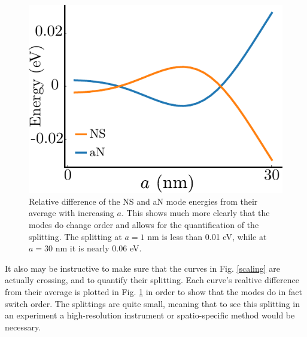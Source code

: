 \documentclass [11pt, proquest] {uwthesis}[2016/11/22]
\begin{document}
\newpage
\begin{figure}
\begin{centering}
\includegraphics{eig_diff_scale.pdf}
\caption{Relative difference of the NS and aN mode energies from their average with increasing $a$. This shows much more clearly that the modes do change order and allows for the quantification of the splitting. The splitting at $a = 1$ nm is less than 0.01 eV, while at $a = 30$ nm it is nearly 0.06 eV.}
\label{diff_scale}
\end{centering}
\end{figure}

It also may be instructive to make sure that the curves in Fig. \ref{scaling} are actually crossing, and to quantify their splitting. Each curve's realtive difference from their average is plotted in Fig. \ref{diff_scale} in order to show that the modes do in fact switch order. The splittings are quite small, meaning that to see this splitting in an experiment a high-resolution instrument or spatio-specific method would be necessary.
\end{document}
